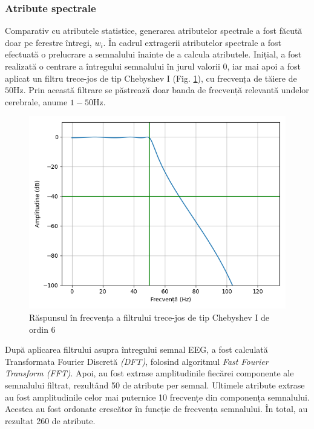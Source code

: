 \subsubsection*{Atribute spectrale}
Comparativ cu atributele statistice, generarea atributelor spectrale a fost făcută doar pe ferestre întregi, $w_i$. În cadrul extragerii atributelor spectrale a fost efectuată o prelucrare a semnalului înainte de a calcula atributele. Inițial, a fost realizată o centrare a întregului semnalului în jurul valorii $0$, iar mai apoi a fost aplicat un filtru trece-jos de tip Chebyshev I (Fig. \ref{fig:cheb1-filt}), cu frecvența de tăiere de $50\si{\hertz}$. Prin această filtrare se păstrează doar banda de frecvență relevantă undelor cerebrale, anume $1-50\si{\hertz}$.
\begin{figure}[ht]
\centering
\includegraphics[width=\textwidth, keepaspectratio]{fig/cap3/cheb1-filt.png}
\caption{Răspunsul în frecvența a filtrului trece-jos de tip Chebyshev I de ordin 6}
\label{fig:cheb1-filt}
\end{figure}

După aplicarea filtrului asupra întregului semnal EEG, a fost calculată Transformata Fourier Discretă \textit{(DFT)}, folosind algoritmul \textit{Fast Fourier Transform (FFT)}. Apoi, au fost extrase amplitudinile fiecărei componente ale semnalului filtrat, rezultând 50 de atribute per semnal. Ultimele atribute extrase au fost amplitudinile celor mai puternice 10 frecvențe din componența semnalului. Acestea au fost ordonate crescător în funcție de frecvența semnalului. În total, au rezultat 260 de atribute.

